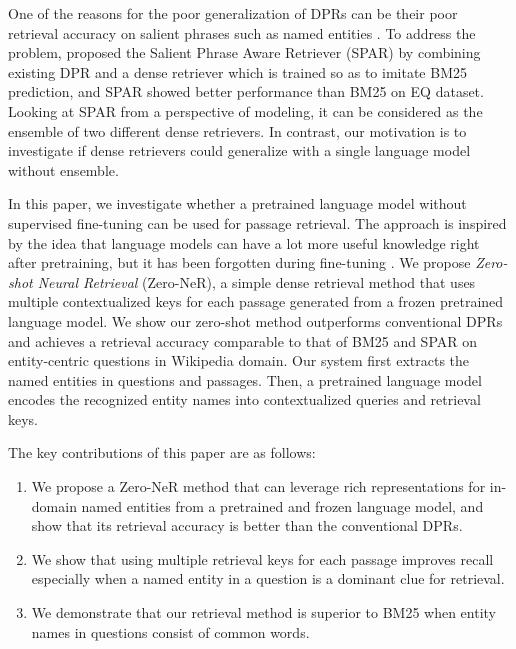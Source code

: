 \documentclass[letterpaper]{article} %
\begin{document}
One of the reasons for the poor generalization of DPRs can be their poor retrieval accuracy on salient phrases such as named entities \citep[e.g.,][]{karpukhin-etal-2020-dense}.
To address the problem, \citet{Chen2021SalientPA} proposed the Salient Phrase Aware Retriever (SPAR) by combining existing DPR and a dense retriever which is trained so as to imitate BM25 prediction, and SPAR showed better performance than BM25 on EQ dataset.
Looking at SPAR from a perspective of modeling, it can be considered as the ensemble of two different dense retrievers.
In contrast, our motivation is to investigate if dense retrievers could generalize with a single language model without ensemble.

In this paper, we investigate whether a pretrained language model without supervised fine-tuning can be used for passage retrieval.
The approach is inspired by the idea that language models can have a lot more useful knowledge right after pretraining, but it has been forgotten during fine-tuning \citep[e.g.,][]{chen-etal-2020-recall}.
We propose \textit{Zero-shot Neural Retrieval} (Zero-NeR), a simple dense retrieval method that uses multiple contextualized keys for each passage generated from a frozen pretrained language model.
We show our zero-shot method outperforms conventional DPRs and achieves a retrieval accuracy comparable to that of BM25 and SPAR on entity-centric questions in Wikipedia domain.
Our system first extracts the named entities in questions and passages.
Then, a pretrained language model encodes the recognized entity names into contextualized queries and retrieval keys.

The key contributions of this paper are as follows:
\begin{enumerate}
	\item We propose a Zero-NeR method that can leverage rich representations for in-domain named entities from a pretrained and frozen language model, and show that its retrieval accuracy is better than the conventional DPRs.
	\item We show that using multiple retrieval keys for each passage improves recall especially when a named entity in a question is a dominant clue for retrieval.
	\item We demonstrate that our retrieval method is superior to BM25 when entity names in questions consist of common words.
\end{enumerate}
\end{document}
